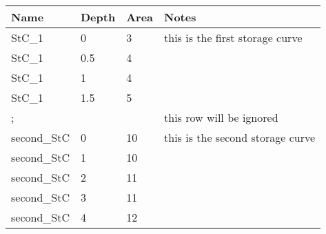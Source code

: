\documentclass[10pt,a4paper,oneside]{scrbook}
\begin{document}
\begin{tabular}{|p{1.7cm}|p{1.3cm}|P{1.3cm}|P{6cm}|}
\hline 
\textbf{Name} & \textbf{Depth} & \textbf{Area} & \textbf{Notes}\\ 
\hline 
StC\_1 & 0 & 3 & this is the first storage curve\\
\hline 
StC\_1 & 0.5 & 4 & \\
\hline 
StC\_1 & 1 & 4 & \\
\hline 
StC\_1 & 1.5 & 5 & \\
\hline 
; &  &  & this row will be ignored\\
\hline 
second\_StC & 0 & 10 & this is the second storage curve\\
\hline 
second\_StC & 1 & 10 & \\
\hline 
second\_StC & 2 & 11 & \\
\hline 
second\_StC & 3 & 11 & \\
\hline 
second\_StC & 4 & 12 & \\
\hline 
\end{tabular}
\end{document}
